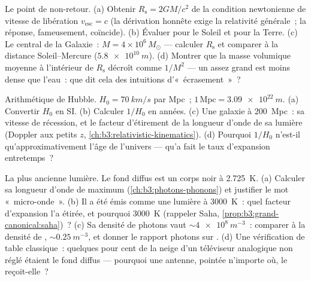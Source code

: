 \begin{exercise}[$\star\star$]\label{exo:b3:astrophysics:8}
Le point de non-retour. (a) Obtenir $R_{\text{s}} = 2GM/c^2$ de la
condition newtonienne de vitesse de libération
$v_{\text{esc}} = c$ (la dérivation honnête exige la relativité
générale~; la réponse, fameusement, coïncide). (b) Évaluer pour le
Soleil et pour la Terre. (c) Le  central de la Galaxie~:
$M = 4\times10^6\,M_\odot$ --- calculer $R_{\text{s}}$ et comparer à
la distance Soleil--Mercure ($\qty{5.8e10}{m}$). (d) Montrer que la
masse volumique moyenne à l'intérieur de $R_{\text{s}}$ décroît comme
$1/M^2$ --- un  assez grand est moins dense que l'eau~: que
dit cela des intuitions d'«~écrasement~»~?
\end{exercise}

\begin{exercise}[$\star\star\star$]\label{exo:b3:astrophysics:9}
Arithmétique de Hubble. $H_0 = \qty{70}{km/s}$ par Mpc~; $1\,
\text{Mpc} = \qty{3.09e22}{m}$. (a) Convertir $H_0$ en SI. (b)
Calculer $1/H_0$ en années. (c) Une galaxie à \qty{200}{Mpc}~: sa
vitesse de récession, et le facteur d'étirement de la longueur d'onde
de sa lumière (Doppler aux petits $z$,
\cref{ch:b3:relativistic-kinematics}). (d) Pourquoi $1/H_0$ n'est-il
qu'approximativement l'âge de l'univers --- qu'a fait le taux
d'expansion entretemps~?
\end{exercise}

\begin{exercise}[$\star\star\star$]\label{exo:b3:astrophysics:10}
La plus ancienne lumière. Le fond diffus est un corps noir à
\qty{2.725}{K}. (a) Calculer sa longueur d'onde de maximum
(\cref{ch:b3:photons-phonons}) et justifier le mot
«~micro-onde~». (b) Il a été émis comme une lumière à \qty{3000}{K}~:
quel facteur d'expansion l'a étirée, et pourquoi \qty{3000}{K}
(rappeler Saha, \cref{prop:b3:grand-canonical:saha})~? (c) Sa densité
de photons vaut $\sim\qty{4e8}{m^{-3}}$~: comparer à la densité de
, $\sim\qty{0.25}{m^{-3}}$, et donner le rapport photons sur
. (d) Une vérification de table classique~: quelques pour cent
de la neige d'un téléviseur analogique non réglé étaient le fond
diffus --- pourquoi une antenne, pointée n'importe où, le
reçoit-elle~?
\end{exercise}

